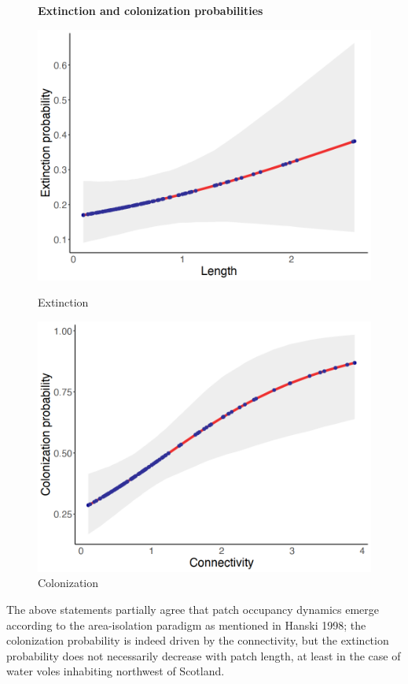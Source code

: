 \documentclass[12pt,a4paper]{article}
\begin{document}
\begin{figure} [H]
    \centering
    \textbf{Extinction and colonization probabilities}\par\medskip
    \begin{minipage}{.5\textwidth}
      \centering
      \includegraphics[width=0.8\linewidth]{extinction_by_length.png}
      \caption{Extinction}
      \label{fig:Extinction by patch length}
    \end{minipage}%
    \begin{minipage}{.5\textwidth}
      \centering
      \includegraphics[width=0.8\linewidth]{colonization_by_connectivity.png}
      \caption{Colonization}
      \label{fig:Colonization by connectivity}
    \end{minipage}
\end{figure}

The above statements partially agree that patch occupancy dynamics emerge according to the area-isolation paradigm as mentioned in Hanski 1998; the colonization probability is indeed driven by the connectivity, but the extinction probability does not necessarily decrease with patch length, at least in the case of water voles inhabiting northwest of Scotland.
\end{document}
